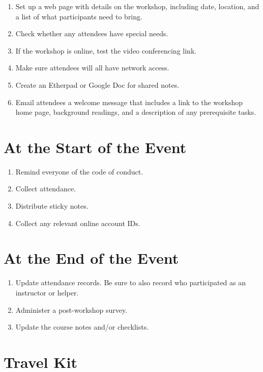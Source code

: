 \begin{enumerate}
\item
  Set up a web page with details on the workshop, including date,
  location, and a list of what participants need to bring.
\item
  Check whether any attendees have special needs.
\item
  If the workshop is online, test the video conferencing link.
\item
  Make sure attendees will all have network access.
\item
  Create an Etherpad or Google Doc for shared notes.
\item
  Email attendees a welcome message that includes a link to the
  workshop home page, background readings, and a description of any
  prerequisite tasks.
\end{enumerate}

\section{At the Start of the Event}\label{at-the-start-of-the-event}

\begin{enumerate}
\item
  Remind everyone of the code of conduct.
\item
  Collect attendance.
\item
  Distribute sticky notes.
\item
  Collect any relevant online account IDs.
\end{enumerate}

\section{At the End of the Event}\label{at-the-end-of-the-event}

\begin{enumerate}
\item
  Update attendance records. Be sure to also record who participated
  as an instructor or helper.
\item
  Administer a post-workshop survey.
\item
  Update the course notes and/or checklists.
\end{enumerate}

\section{Travel Kit}\label{travel-kit}

